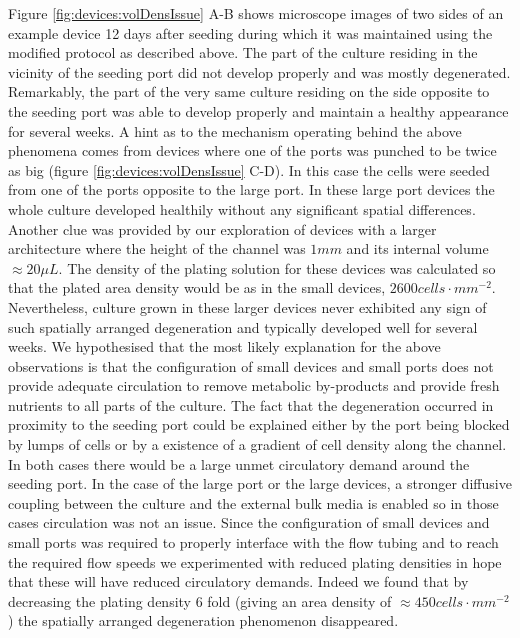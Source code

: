         Figure \ref{fig:devices:volDensIssue} A-B shows microscope images of two sides of an example device 12 days after seeding during which it was maintained using the modified protocol as described above. The part of the culture residing in the vicinity of the seeding port did not develop properly and was mostly degenerated. Remarkably, the part of the very same culture residing on the side opposite to the seeding port was able to develop properly and maintain a healthy appearance for several weeks. A hint as to the mechanism operating behind the above phenomena comes from devices where one of the ports was punched to be twice as big (figure \ref{fig:devices:volDensIssue} C-D). In this case the cells were seeded from one of the ports opposite to the large port. In these large port devices the whole culture developed healthily without any significant spatial differences. Another clue was provided by our exploration of devices with a larger architecture where the height of the channel was \(1 mm\) and its internal volume \(\approx 20 \mu L\). The density of the plating solution for these devices was calculated so that the plated area density would be as in the small devices, \(2600 cells\cdot mm^{-2}\). Nevertheless, culture grown in these larger devices never exhibited any sign of such spatially arranged degeneration and typically developed well for several weeks. We hypothesised that the most likely explanation for the above observations is that the configuration of small devices and small ports does not provide adequate circulation to remove metabolic by-products and provide fresh nutrients to all parts of the culture. The fact that the degeneration occurred in proximity to the seeding port could be explained either by the port being blocked by lumps of cells or by a existence of a gradient of cell density along the channel. In both cases there would be a large unmet circulatory demand around the seeding port. In the case of the large port or the large devices, a stronger diffusive coupling between the culture and the external bulk media is enabled so in those cases circulation was not an issue. Since the configuration of small devices and small ports was required to properly interface with the flow tubing and to reach the required flow speeds we experimented with reduced plating densities in hope that these will have reduced circulatory demands. Indeed we found that by decreasing the plating density 6 fold (giving an area density of \(\approx 450 cells\cdot mm^{-2}\)) the spatially arranged degeneration phenomenon disappeared.


